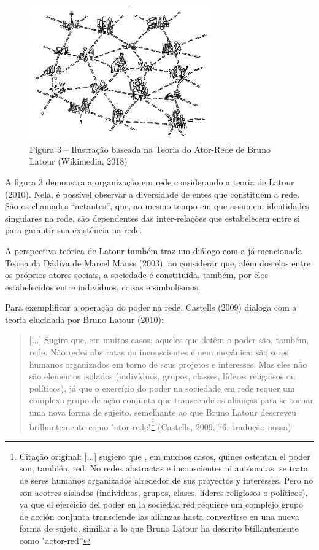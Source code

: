 \begin{figure}[!ht]
\centering
  \includegraphics[width=80mm]{./imgs/grafico4.jpg}
\caption{Figura 3 -- Ilustração baseada na Teoria do Ator-Rede de Bruno Latour (Wikimedia, 2018)}
 \end{figure}

A figura 3 demonstra a organização em rede considerando a teoria de
Latour (2010). Nela, é possível observar a diversidade de entes que
constituem a rede. São os chamados ``actantes'', que, ao mesmo tempo em
que assumem identidades singulares na rede, são dependentes das
inter-relações que estabelecem entre si para garantir sua existência na
rede.

A perspectiva teórica de Latour também traz um diálogo com a já
mencionada Teoria da Dádiva de Marcel Mauss (2003), ao considerar que,
além dos elos entre os próprios atores sociais, a sociedade é
constituída, também, por elos estabelecidos entre indivíduos, coisas e
simbolismos.

Para exemplificar a operação do poder na rede, Castells (2009) dialoga
com a teoria elucidada por Bruno Latour (2010):

\begin{quote}
{[}...{]} Sugiro que, em muitos casos, aqueles que detêm o poder são,
também, rede. Não redes abstratas ou inconscientes e nem mecânica: são
seres humanos organizados em torno de seus projetos e interesses. Mas
eles não são elementos isolados (indivíduos, grupos, classes, líderes
religiosos ou políticos), já que o exercício do poder na sociedade em
rede requer um complexo grupo de ação conjunta que transcende as
alianças para se tornar uma nova forma de sujeito, semelhante ao que
Bruno Latour descreveu brilhantemente como "ator-rede"\footnote{Citação
  original: {[}...{]} sugiero que , em muchos casos, quines ostentan el
  poder son, también, red. No redes abstractas e inconscientes ni
  autómatas: se trata de seres humanos organizados alrededor de sus
  proyectos y interesses. Pero no son acotres aislados (individuos,
  grupos, clases, líderes religiosos o políticos), ya que el ejercicio
  del poder en la sociedad red requiere um complejo grupo de acción
  conjunta transciende las alianzas hasta convertirse en una nueva forma
  de sujeto, similiar a lo que Bruno Latour ha descrito btillantemente
  como "actor-red''} (Castells, 2009, 76, tradução nossa)
\end{quote}

